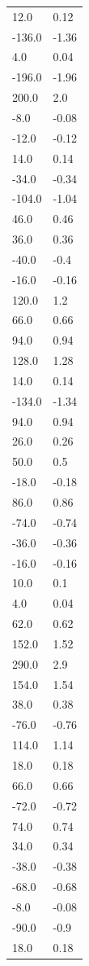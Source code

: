 \begin{longtable}{ll}
12.0 & 0.12 \\
-136.0 & -1.36 \\
4.0 & 0.04 \\
-196.0 & -1.96 \\
200.0 & 2.0 \\
-8.0 & -0.08 \\
-12.0 & -0.12 \\
14.0 & 0.14 \\
-34.0 & -0.34 \\
-104.0 & -1.04 \\
46.0 & 0.46 \\
36.0 & 0.36 \\
-40.0 & -0.4 \\
-16.0 & -0.16 \\
120.0 & 1.2 \\
66.0 & 0.66 \\
94.0 & 0.94 \\
128.0 & 1.28 \\
14.0 & 0.14 \\
-134.0 & -1.34 \\
94.0 & 0.94 \\
26.0 & 0.26 \\
50.0 & 0.5 \\
-18.0 & -0.18 \\
86.0 & 0.86 \\
-74.0 & -0.74 \\
-36.0 & -0.36 \\
-16.0 & -0.16 \\
10.0 & 0.1 \\
4.0 & 0.04 \\
62.0 & 0.62 \\
152.0 & 1.52 \\
290.0 & 2.9 \\
154.0 & 1.54 \\
38.0 & 0.38 \\
-76.0 & -0.76 \\
114.0 & 1.14 \\
18.0 & 0.18 \\
66.0 & 0.66 \\
-72.0 & -0.72 \\
74.0 & 0.74 \\
34.0 & 0.34 \\
-38.0 & -0.38 \\
-68.0 & -0.68 \\
-8.0 & -0.08 \\
-90.0 & -0.9 \\
18.0 & 0.18 \\

\end{longtable}
